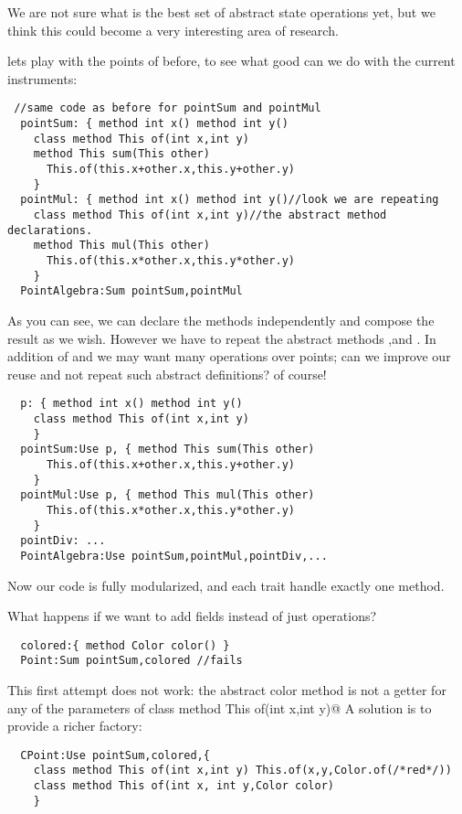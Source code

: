 We are not sure what is the best set of abstract state operations yet, but we think this could become a very interesting area of research.
  
  
  lets play with the points of before, to see what good can we do with the current
  instruments:

\begin{lstlisting}
 //same code as before for pointSum and pointMul
  pointSum: { method int x() method int y()
    class method This of(int x,int y)
    method This sum(This other)
      This.of(this.x+other.x,this.y+other.y)
    }
  pointMul: { method int x() method int y()//look we are repeating
    class method This of(int x,int y)//the abstract method declarations.
    method This mul(This other)
      This.of(this.x*other.x,this.y*other.y)
    }
  PointAlgebra:Sum pointSum,pointMul
\end{lstlisting}  

  As you can see, we can declare the methods independently and compose the result
  as we wish. However we have to repeat the abstract methods \Q@x@,\Q@y@ and \Q@of@.
  In addition of \Q@Sum@ and \Q@Mul@ we may want many operations over points; can we improve our reuse
  and not repeat such abstract definitions? of course!

\begin{lstlisting}
  p: { method int x() method int y()
    class method This of(int x,int y)
    }
  pointSum:Use p, { method This sum(This other)
      This.of(this.x+other.x,this.y+other.y)
    }
  pointMul:Use p, { method This mul(This other)
      This.of(this.x*other.x,this.y*other.y)
    }
  pointDiv: ...
  PointAlgebra:Use pointSum,pointMul,pointDiv,...
\end{lstlisting}
      
Now our code is fully modularized, and each trait handle exactly one method.

What happens if we want to add fields instead of just operations?

\begin{lstlisting}
  colored:{ method Color color() }
  Point:Sum pointSum,colored //fails
\end{lstlisting}

This first attempt does not work: the abstract color method
is not a getter for any of the parameters of 
\Q@ class method This of(int x,int y)@
A solution is to provide a richer factory:

\begin{lstlisting}
  CPoint:Use pointSum,colored,{
    class method This of(int x,int y) This.of(x,y,Color.of(/*red*/))
    class method This of(int x, int y,Color color)
    }
\end{lstlisting}

